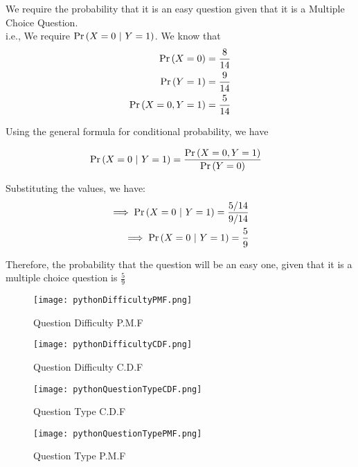 \documentclass[journal,12pt,twocolumn]{IEEEtran}
\begin{document}
We require the probability that it is an easy question given that it is a Multiple Choice Question.\\
i.e., We require $\Pr\left(X = 0\ |\ Y = 1\right)$. We know that
\begin{align}
    \Pr\left(X = 0\right) = \frac{8}{14}\\
    \Pr\left(Y = 1\right) = \frac{9}{14}\\
   \Pr\left(X = 0, Y = 1\right) = \frac{5}{14}
\end{align}

\pagebreak

Using the general formula for conditional probability, we have 

\begin{align}
    &\Pr\left(X = 0\ |\ Y = 1\right) = \frac{\Pr\left(X = 0, Y = 1\right)}{\Pr\left(Y = 0\right)}&
\end{align}

Substituting the values, we have:
\begin{align}
    \implies \Pr\left(X = 0\ |\ Y = 1\right) = \frac{5/14}{9/14}\\
    \implies \Pr\left(X = 0\ |\ Y = 1\right) = \frac{5}{9}
\end{align}

Therefore, the probability that the question will be an easy one, given that it is a multiple choice question is $\displaystyle\frac{5}{9}$

\begin{figure}[!ht]
       \centering
       \texttt{[image: pythonDifficultyPMF.png]}
       \label{fig:Question Difficulty PMF}
       \caption{Question Difficulty P.M.F}
\end{figure}

\begin{figure}[!ht]
       \centering
       \texttt{[image: pythonDifficultyCDF.png]}
       \caption{Question Difficulty C.D.F}
       \label{fig:Question Difficulty CDF}
\end{figure}

\begin{figure}[!ht]
       \centering
       \texttt{[image: pythonQuestionTypeCDF.png]}
       \caption{Question Type C.D.F}
       \label{fig:Question Type CDF}
\end{figure}

\begin{figure}[!ht]
       \centering
       \texttt{[image: pythonQuestionTypePMF.png]}
       \caption{Question Type P.M.F}
       \label{fig:Question Type PMF}
\end{figure}
\end{document}
